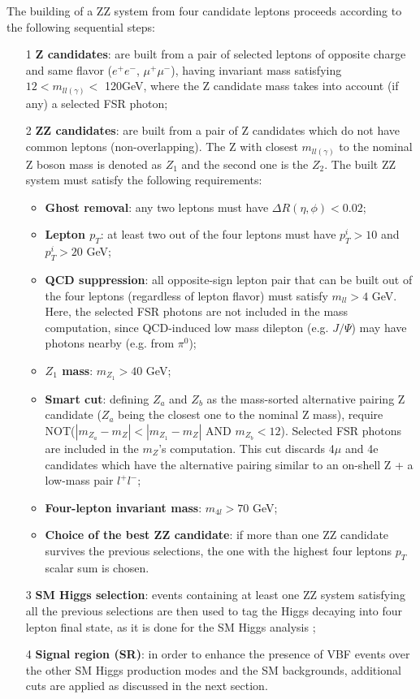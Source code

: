 The building of a ZZ system from four candidate leptons proceeds according to the following sequential steps:
\begin{itemize}
	\item [1] \textbf{Z candidates}: are built from a pair of selected leptons of opposite charge and same flavor ($e^{+}e^{-}$, $\mu^{+}\mu^{-}$), having invariant mass satisfying $12 < m_{ll(\gamma)}<$ 120GeV, where the Z candidate mass takes into account (if any) a selected FSR photon;
	\item [2] \textbf{ZZ candidates}: are built from a pair of Z candidates which do not have common leptons (non-overlapping). The Z with closest $m_{ll(\gamma)}$ to the nominal Z boson mass is denoted as $Z_{1}$ and the second one is the $Z_{2}$. The built ZZ system must satisfy the following requirements:
	\begin{itemize}
		\item \textbf{Ghost removal}: any two leptons must have $\Delta R(\eta,\phi) < 0.02$;
		\item \textbf{Lepton $p_{T}$}: at least two out of the four leptons must have $p^{i}_{T} > 10$ and $p^{i}_{T} > 20$ GeV;
		\item \textbf{QCD suppression}: all opposite-sign lepton pair that can be built out of the four leptons (regardless of lepton flavor) must satisfy $m_{ll} > 4$ GeV. Here, the selected FSR photons are not included in the mass computation, since QCD-induced low mass dilepton (e.g. $J/\Psi$) may have photons nearby (e.g. from $\pi^{0}$);
		\item \textbf{$Z_{1}$ mass}: $m_{Z_{1}} > 40$ GeV;
		\item \textbf{Smart cut}: defining $Z_{a}$ and $Z_{b}$ as the mass-sorted alternative pairing Z candidate ($Z_{a}$ being the closest one to the nominal Z mass), require NOT($|m_{Z_{a}}-m_{Z}| < |m_{Z_{1}}-m_{Z}|$ AND $m_{Z_{b}} < 12$). Selected FSR photons are included in the $m_{Z}$'s computation. This cut discards 4$\mu$ and 4e candidates which have the alternative pairing similar to an on-shell Z + a low-mass pair $l^{+}l^{-}$;
		\item \textbf{Four-lepton invariant mass}: $m_{4l} > 70$ GeV;
		\item \textbf{Choice of the best ZZ candidate}: if more than one ZZ candidate survives the previous selections, the one with the highest four leptons $p_{T}$ scalar sum is chosen.
	\end{itemize}
	\item [3] \textbf{SM Higgs selection}: events containing at least one ZZ system satisfying all the previous selections are then used to tag the Higgs decaying into four lepton final state, as it is done for the SM Higgs analysis \cite{bib:CMS-AN-16-442};
	\item [4] \textbf{Signal region (SR)}: in order to enhance the presence of VBF events over the other SM Higgs production modes and the SM backgrounds, additional cuts are applied as discussed in the next section.
\end{itemize}

